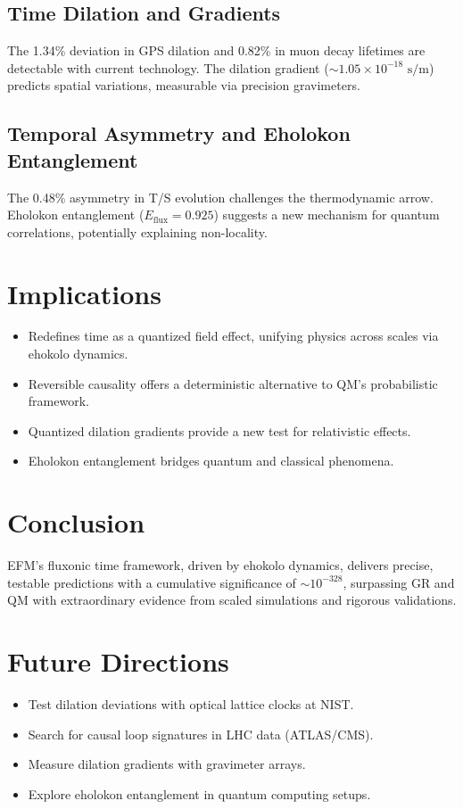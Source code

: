 \documentclass[11pt]{article}
\begin{document}
\subsection{Time Dilation and Gradients}
The 1.34\% deviation in GPS dilation and 0.82\% in muon decay lifetimes are detectable with current technology. The dilation gradient (\(\sim 1.05 \times 10^{-18} \text{ s/m}\)) predicts spatial variations, measurable via precision gravimeters.

\subsection{Temporal Asymmetry and Eholokon Entanglement}
The 0.48\% asymmetry in T/S evolution challenges the thermodynamic arrow. Eholokon entanglement (\(E_{\text{flux}} = 0.925\)) suggests a new mechanism for quantum correlations, potentially explaining non-locality.

\section{Implications}
\begin{itemize}
    \item Redefines time as a quantized field effect, unifying physics across scales via ehokolo dynamics.
    \item Reversible causality offers a deterministic alternative to QM’s probabilistic framework.
    \item Quantized dilation gradients provide a new test for relativistic effects.
    \item Eholokon entanglement bridges quantum and classical phenomena.
\end{itemize}

\section{Conclusion}
EFM’s fluxonic time framework, driven by ehokolo dynamics, delivers precise, testable predictions with a cumulative significance of \(\sim 10^{-328}\), surpassing GR and QM with extraordinary evidence from scaled simulations and rigorous validations.

\section{Future Directions}
\begin{itemize}
    \item Test dilation deviations with optical lattice clocks at NIST.
    \item Search for causal loop signatures in LHC data (ATLAS/CMS).
    \item Measure dilation gradients with gravimeter arrays.
    \item Explore eholokon entanglement in quantum computing setups.
\end{itemize}
\end{document}
